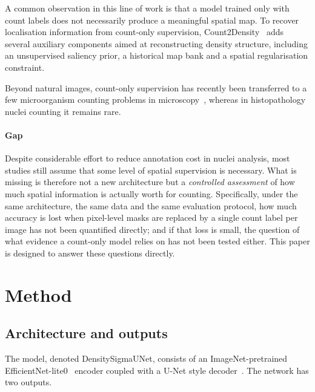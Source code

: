 \documentclass[preprint,12pt]{elsarticle}
\begin{document}
A common observation in this line of work is that a model trained only with count labels does not necessarily
produce a meaningful spatial map. To recover localisation information from count-only supervision,
Count2Density~\cite{count2density} adds several auxiliary components aimed at reconstructing density structure,
including an unsupervised saliency prior, a historical map bank and a spatial regularisation constraint.

Beyond natural images, count-only supervision has recently been transferred to a few microorganism counting
problems in microscopy~\cite{microvit}, whereas in histopathology nuclei counting it remains rare.

\paragraph{Gap} Despite considerable effort to reduce annotation cost in nuclei analysis, most studies still
assume that some level of spatial supervision is necessary. What is missing is therefore not a new
architecture but a \emph{controlled assessment} of how much spatial information is actually worth for counting.
Specifically, under the same architecture, the same data and the same evaluation protocol, how much accuracy is
lost when pixel-level masks are replaced by a single count label per image has not been quantified directly;
and if that loss is small, the question of what evidence a count-only model relies on has not been tested
either. This paper is designed to answer these questions directly.

\section{Method}\label{sec:method}

\subsection{Architecture and outputs}
The model, denoted DensitySigmaUNet, consists of an ImageNet-pretrained EfficientNet-lite0~\cite{efficientnet}
encoder coupled with a U-Net style decoder~\cite{unet}. The network has two outputs.
\end{document}
